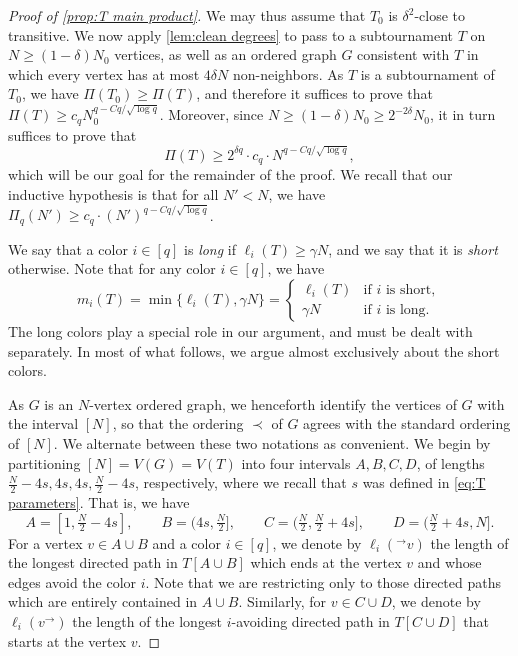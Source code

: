 \documentclass[10pt,a4paper]{amsart}
\begin{document}
\begin{proof}[Proof of \cref{prop:T main product}]
    We may thus assume that $T_0$ is $\delta^2$-close to transitive. We now apply \cref{lem:clean degrees} to pass to a subtournament $T$ on $N \geq (1-\delta)N_0$ vertices, as well as an ordered graph $G$ consistent with $T$ in which every vertex has at most $4\delta N$ non-neighbors. As $T$ is a subtournament of $T_0$, we have $\Pi(T_0)\geq \Pi(T)$, and therefore it suffices to prove that $\Pi(T) \geq c_q N_0^{q-Cq/\sqrt{\log q}}$. Moreover, since $N \geq (1-\delta)N_0\geq 2^{-2\delta}N_0$, it in turn suffices to prove that 
    \begin{equation}\label{eq:goal}
    \Pi(T)\geq 2^{\delta q}\cdot c_q\cdot N^{q-Cq/\sqrt{\log q}},
    \end{equation}
    which will be our goal for the remainder of the proof. We recall that our inductive hypothesis is that for all $N'<N$, we have $\Pi_q(N') \geq c_q\cdot (N')^{q-Cq/\sqrt{\log q}}$. 


    We say that a color $i\in [q]$ is \emph{long} if $\ell_i(T)\geq \gamma N$, and we say that it is \emph{short} otherwise. Note that for any color $i \in [q]$, we have 
    \[
        m_i(T) = \min\{\ell_i(T), \gamma N\} = 
        \begin{cases}
            \ell_i(T) & \text{if $i$ is short},\\
            \gamma N & \text{if $i$ is long}.
        \end{cases}
    \]
    The long colors play a special role in our argument, and must be dealt with separately. In most of what follows, we argue almost exclusively about the short colors. 

    As $G$ is an $N$-vertex ordered graph, we henceforth identify the vertices of $G$ with the interval $[N]$, so that the ordering $\prec$ of $G$ agrees with the standard ordering of $[N]$. We alternate between these two notations as convenient.
    We begin by partitioning $[N]=V(G)=V(T)$ into four intervals $A,B,C,D$, of lengths $\frac N2-4s, 4s, 4s, \frac N2-4s$, respectively, where we recall that $s$ was defined in \eqref{eq:T parameters}. That is, we have
    \[
        A = [1,\tfrac N2-4s], \qquad B = (4s,\tfrac N2], \qquad C = (\tfrac N2, \tfrac N2+4s], \qquad D = (\tfrac N2+4s,N].
    \]
    For a vertex $v \in A\cup B$ and a color $i\in [q]$, we denote by $\ell_i(^\to v)$ the length of the longest directed path in $T[A \cup B]$ which ends at the vertex $v$ and whose edges avoid the color $i$. Note that we are restricting only to those directed paths which are entirely contained in $A\cup B$. Similarly, for $v\in C\cup D$, we denote by $\ell_i(v^\to)$ the length of the longest $i$-avoiding directed path in $T[C\cup D]$ that starts at the vertex $v$.


\end{proof}
\end{document}

